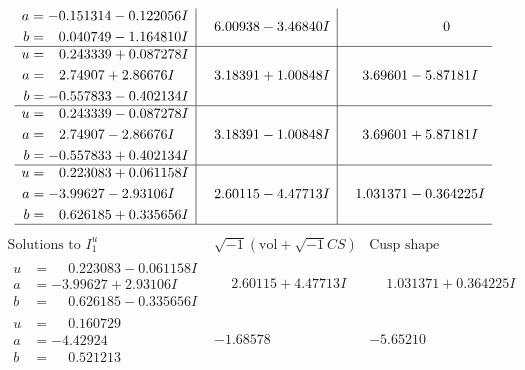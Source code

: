 \documentclass[1p]{elsarticle_modified}
\theoremstyle{definition}
\newcommand{\I}{\sqrt{-1}}
\begin{document}
$$\begin{array}{c|c|c}
\begin{aligned}
a &= -0.151314 - 0.122056 I \\
b &= \phantom{-}0.040749 - 1.164810 I\end{aligned}
 & \phantom{-}6.00938 - 3.46840 I & \phantom{-0.000000 } 0 \\ \hline\begin{aligned}
u &= \phantom{-}0.243339 + 0.087278 I \\
a &= \phantom{-}2.74907 + 2.86676 I \\
b &= -0.557833 - 0.402134 I\end{aligned}
 & \phantom{-}3.18391 + 1.00848 I & \phantom{-}3.69601 - 5.87181 I \\ \hline\begin{aligned}
u &= \phantom{-}0.243339 - 0.087278 I \\
a &= \phantom{-}2.74907 - 2.86676 I \\
b &= -0.557833 + 0.402134 I\end{aligned}
 & \phantom{-}3.18391 - 1.00848 I & \phantom{-}3.69601 + 5.87181 I \\ \hline\begin{aligned}
u &= \phantom{-}0.223083 + 0.061158 I \\
a &= -3.99627 - 2.93106 I \\
b &= \phantom{-}0.626185 + 0.335656 I\end{aligned}
 & \phantom{-}2.60115 - 4.47713 I & \phantom{-}1.031371 - 0.364225 I\\
 \hline 
 \end{array}$$\newpage$$\begin{array}{c|c|c}  
\text{Solutions to }I^u_{1}& \I (\text{vol} + \sqrt{-1}CS) & \text{Cusp shape}\\
 \hline 
\begin{aligned}
u &= \phantom{-}0.223083 - 0.061158 I \\
a &= -3.99627 + 2.93106 I \\
b &= \phantom{-}0.626185 - 0.335656 I\end{aligned}
 & \phantom{-}2.60115 + 4.47713 I & \phantom{-}1.031371 + 0.364225 I \\ \hline\begin{aligned}
u &= \phantom{-}0.160729\phantom{ +0.000000I} \\
a &= -4.42924\phantom{ +0.000000I} \\
b &= \phantom{-}0.521213\phantom{ +0.000000I}\end{aligned}
 & -1.68578\phantom{ +0.000000I} & -5.65210\phantom{ +0.000000I} \\ \hline\begin{aligned}

\end{aligned}
\end{array}$$
\end{document}
